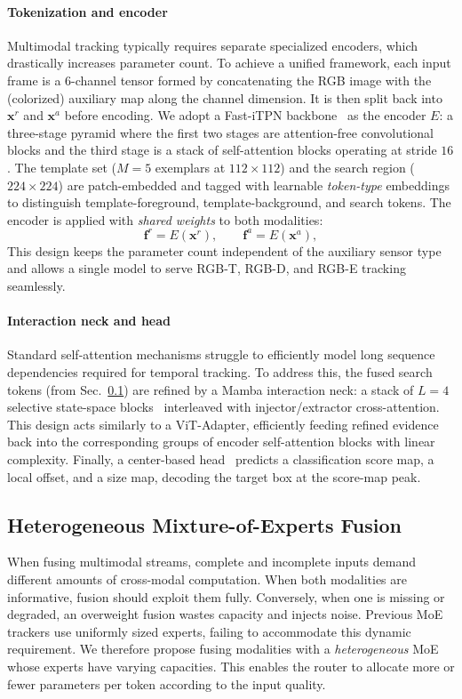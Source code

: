 \paragraph*{Tokenization and encoder}
Multimodal tracking typically requires separate specialized encoders, which drastically increases parameter count. To achieve a unified framework, each input frame is a $6$-channel tensor formed by concatenating the RGB image with the (colorized) auxiliary map along the channel dimension. It is then split back into $\mathbf{x}^{r}$ and $\mathbf{x}^{a}$ before encoding. We adopt a Fast-iTPN backbone~\cite{tian2023fastitpn} as the encoder $E$: a three-stage pyramid where the first two stages are attention-free convolutional blocks and the third stage is a stack of self-attention blocks operating at stride $16$. The template set ($M\!=\!5$ exemplars at $112\!\times\!112$) and the search region ($224\!\times\!224$) are patch-embedded and tagged with learnable \emph{token-type} embeddings to distinguish template-foreground, template-background, and search tokens. The encoder is applied with \emph{shared weights} to both modalities:
\begin{equation}
  \mathbf{f}^{r}=E(\mathbf{x}^{r}),\qquad
  \mathbf{f}^{a}=E(\mathbf{x}^{a}),
  \label{eq:encode}
\end{equation}
This design keeps the parameter count independent of the auxiliary sensor type and allows a single model to serve RGB-T, RGB-D, and RGB-E tracking seamlessly.

\paragraph*{Interaction neck and head}
Standard self-attention mechanisms struggle to efficiently model long sequence dependencies required for temporal tracking. To address this, the fused search tokens (from Sec.~\ref{subsec:hmoe}) are refined by a Mamba interaction neck: a stack of $L\!=\!4$ selective state-space blocks~\cite{gu2023mamba} interleaved with injector/extractor cross-attention. This design acts similarly to a ViT-Adapter, efficiently feeding refined evidence back into the corresponding groups of encoder self-attention blocks with linear complexity. Finally, a center-based head~\cite{ye2022ostrack} predicts a classification score map, a local offset, and a size map, decoding the target box at the score-map peak.

\subsection{Heterogeneous Mixture-of-Experts Fusion}
\label{subsec:hmoe}
When fusing multimodal streams, complete and incomplete inputs demand different amounts of cross-modal computation. When both modalities are informative, fusion should exploit them fully. Conversely, when one is missing or degraded, an overweight fusion wastes capacity and injects noise. Previous MoE trackers use uniformly sized experts, failing to accommodate this dynamic requirement. We therefore propose fusing modalities with a \emph{heterogeneous} MoE whose experts have varying capacities. This enables the router to allocate more or fewer parameters per token according to the input quality.

